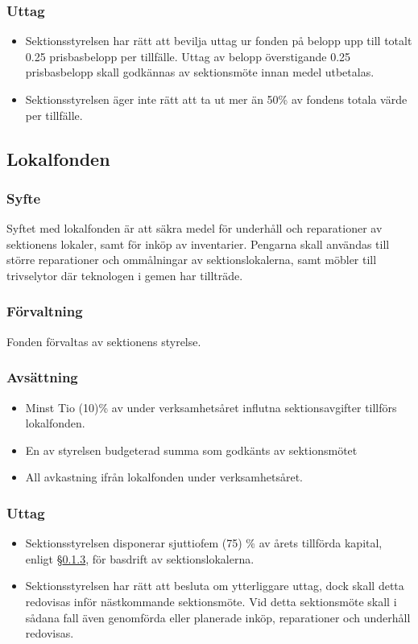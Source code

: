 \documentclass[a4paper, 10pt]{article}
\def\roundandprint #1{\xinttheiexpr #1\relax }
\newcommand{\prisbasbelopp}[1]{
    #1 prisbasbelopp
    \ifdef{\nuvarandeprisbasbelopp}{
        \marginpar{
            \small{ \textbf{\roundandprint{\xintiexpr#1 * \nuvarandeprisbasbelopp\relax}kr}}
        }
    }{}
}
\begin{document}
\subsubsection{Uttag}
\begin{itemize}
\item Sektionsstyrelsen har rätt att bevilja uttag ur fonden på belopp upp till totalt \prisbasbelopp{0.25} per tillfälle. Uttag av belopp överstigande \prisbasbelopp{0.25} skall godkännas av sektionsmöte innan medel utbetalas.
\item Sektionsstyrelsen äger inte rätt att ta ut mer än 50\% av fondens totala värde per tillfälle.
\end{itemize}

\subsection{Lokalfonden}
\subsubsection{Syfte}
\label{sec:lokalfond_syfte}
Syftet med lokalfonden är att säkra medel för underhåll och reparationer av sektionens lokaler, samt för inköp av inventarier. Pengarna skall användas till större reparationer och ommålningar av sektionslokalerna, samt möbler till trivselytor där teknologen i gemen har tillträde.
\subsubsection{Förvaltning}
Fonden förvaltas av sektionens styrelse.
\subsubsection{Avsättning}
\label{sec:lokalfond_avsattning}
\begin{itemize}
\item Minst Tio (10)\% av under verksamhetsåret influtna sektionsavgifter tillförs lokalfonden.
\item En av styrelsen budgeterad summa som godkänts av sektionsmötet
\item All avkastning ifrån lokalfonden under verksamhetsåret.
\end{itemize}
\subsubsection{Uttag}
\begin{itemize}
\item Sektionsstyrelsen disponerar sjuttiofem (75) \% av årets tillförda kapital,
enligt \S\ref{sec:lokalfond_avsattning}, för basdrift av sektionslokalerna.
\item Sektionsstyrelsen har rätt att besluta om ytterliggare uttag, dock skall detta redovisas inför nästkommande sektionsmöte. Vid detta sektionsmöte skall i sådana fall även genomförda eller planerade inköp, reparationer och underhåll redovisas.
\end{itemize}
\end{document}

